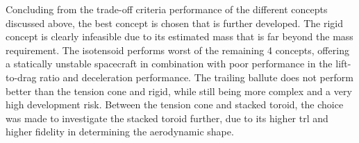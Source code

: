 Concluding from the trade-off criteria performance of the different concepts discussed above, the best concept is chosen that is further developed. The rigid concept is clearly infeasible due to its estimated mass that is far beyond the mass requirement. The isotensoid performs worst of the remaining 4 concepts, offering a statically unstable spacecraft in combination with poor performance in the lift-to-drag ratio and deceleration performance. The trailing ballute does not perform better than the tension cone and rigid, while still being more complex and a very high development risk. Between the tension cone and stacked toroid, the choice was made to investigate the stacked toroid further, due to its higher \gls{trl} and higher fidelity in determining the aerodynamic shape.